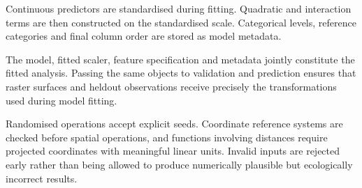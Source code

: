 \documentclass[letterpaper,10pt,english]{sphinxmanual}
\begin{document}
\begin{sphinxVerbatim}[commandchars=\\\{\}]
 

  
    \PYG{p}{[} \PYG{p}{]}
    \PYG{p}{[}\PYG{p}{]}
    \PYG{p}{[} \PYG{p}{]}
    \PYG{p}{[}\PYG{p}{]}
\end{sphinxVerbatim}

\sphinxAtStartPar
Continuous predictors are standardised during fitting. Quadratic and interaction terms are then constructed on the standardised scale. Categorical levels, reference categories and final column order are stored as model metadata.

\begin{sphinxVerbatim}[commandchars=\\\{\}]
      
\end{sphinxVerbatim}

\sphinxAtStartPar
The model, fitted scaler, feature specification and metadata jointly constitute the fitted analysis. Passing the same objects to validation and prediction ensures that raster surfaces and held\sphinxhyphen{}out observations receive precisely the transformations used during model fitting.

\sphinxAtStartPar
Randomised operations accept explicit seeds. Coordinate reference systems are checked before spatial operations, and functions involving distances require projected coordinates with meaningful linear units. Invalid inputs are rejected early rather than being allowed to produce numerically plausible but ecologically incorrect results.
\end{document}
